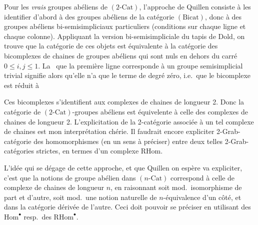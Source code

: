 \documentclass[11pt,a4paper]{article}
\begin{document}

Pour les \emph{vrais} groupes abéliens de $(2\text{-Cat})$, l'approche de
Quillen consiste à les identifier d'abord à des groupes abéliens de la
catégorie $(\mathrm{Bicat})$, donc à des groupes abéliens bi-semisimpliciaux
particuliers (conditions sur chaque ligne et chaque colonne). Appliquant la
version bi-semisimpliciale du tapis de Dold, on trouve que la catégorie de
ces objets est équivalente à la catégorie des bicomplexes de chaines de
groupes abéliens qui sont nuls en dehors du carré $0 \leq i, j \leq 1$. La
\struck{colonne} \add{cond.}\ que la première ligne corresponde à un groupe
semisimplicial trivial signifie alors qu'elle n'a que le terme de degré zéro,
i.e.\ que le bicomplexe est réduit à




Ces bicomplexes s'identifient aux complexes de chaines de longueur 2. Donc la
catégorie de $(2\text{-Cat})$-groupes abéliens est équivelente à celle des
complexes de chaines de longueur 2. L'explicitation de la 2-catégorie associée
à un tel complexe de chaines est mon interprétation chérie. Il faudrait encore
expliciter 2-Grab-catégorie des homomorphismes (en un sens à préciser) entre
deux telles 2-Grab-catégories strictes, en termes d'un complexe
$\mathrm{RHom}$.

L'idée qui se dégage de cette approche, et que Quillen on espère va expliciter,
c'est que la notions de groupe abélien dans $(n\text{-Cat})$ correspond à
celle de complexe de chaines de longueur $n$, en raisonnant soit mod.\
isomorphisme de part et d'autre, soit mod.\ une notion naturelle de
$n$-équivalence d'un côté, et dans la catégorie dérivée de l'autre. Ceci doit
pouvoir se préciser en utilisant des $\mathrm{Hom}^{\bullet}$ resp.\ des
$\mathrm{RHom}^{\bullet}$.
\end{document}
